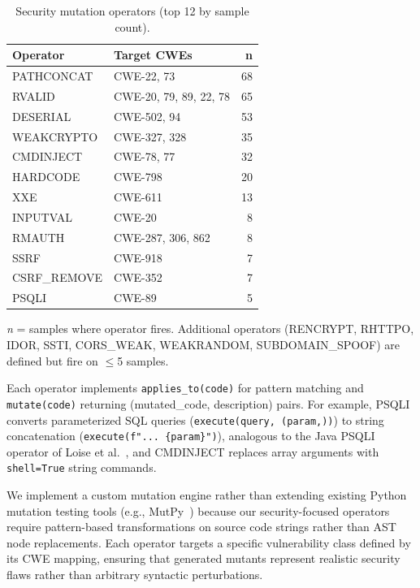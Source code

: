 \documentclass[sigconf,review,anonymous]{acmart}
\begin{document}
\begin{table}[t]
\caption{Security mutation operators (top 12 by sample count).}
\label{tab:operators}
\small
\begin{tabular}{llr}
\toprule
\textbf{Operator} & \textbf{Target CWEs} & \textbf{n} \\
\midrule
PATHCONCAT & CWE-22, 73 & 68 \\
RVALID & CWE-20, 79, 89, 22, 78 & 65 \\
DESERIAL & CWE-502, 94 & 53 \\
WEAKCRYPTO & CWE-327, 328 & 35 \\
CMDINJECT & CWE-78, 77 & 32 \\
HARDCODE & CWE-798 & 20 \\
XXE & CWE-611 & 13 \\
INPUTVAL & CWE-20 & 8 \\
RMAUTH & CWE-287, 306, 862 & 8 \\
SSRF & CWE-918 & 7 \\
CSRF\_REMOVE & CWE-352 & 7 \\
PSQLI & CWE-89 & 5 \\
\bottomrule
\end{tabular}
\vspace{2pt}
{\footnotesize \textit{n} = samples where operator fires. Additional operators (RENCRYPT, RHTTPO, IDOR, SSTI, CORS\_WEAK, WEAKRANDOM, SUBDOMAIN\_SPOOF) are defined but fire on $\leq$5 samples.}
\end{table}

Each operator implements \texttt{applies\_to(code)} for pattern matching and \texttt{mutate(code)} returning (mutated\_code, description) pairs. For example, \textsc{PSQLI} converts parameterized SQL queries (\texttt{execute(query, (param,))}) to string concatenation (\texttt{execute(f"...~\{param\}")}), analogous to the Java PSQLI operator of Loise et al.~\cite{loise2017security}, and \textsc{CMDINJECT} replaces array arguments with \texttt{shell=True} string commands.

We implement a custom mutation engine rather than extending existing Python mutation testing tools (e.g., MutPy~\cite{derezinska2014experimental}) because our security-focused operators require pattern-based transformations on source code strings rather than AST node replacements. Each operator targets a specific vulnerability class defined by its CWE mapping, ensuring that generated mutants represent realistic security flaws rather than arbitrary syntactic perturbations.
\end{document}

